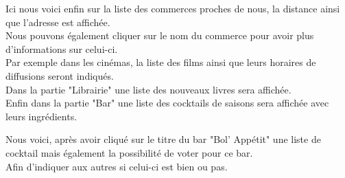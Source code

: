 \documentclass[10pt,a4paper, landscape]{report}
\begin{document}
{{{{Ici nous voici enfin sur la liste des commerces proches de nous, la distance ainsi que l'adresse est affichée. \\
Nous pouvons également cliquer sur le nom du commerce pour avoir plus d'informations sur celui-ci. \\
Par exemple dans les cinémas, la liste des films ainsi que leurs horaires de diffusions seront indiqués. \\
Dans la partie "Librairie" une liste des nouveaux livres sera affichée. \\
Enfin dans la partie "Bar" une liste des cocktails de saisons sera affichée avec leurs ingrédients. \\
{%
\setlength{\fboxsep}{0pt}%
\setlength{\fboxrule}{2pt}%
%

\newpage
Nous voici, après avoir cliqué sur le titre du bar "Bol' Appétit" une liste de cocktail mais également la possibilité de voter pour ce bar. \\
Afin d'indiquer aux autres si celui-ci est bien ou pas. \\
{%
\setlength{\fboxsep}{0pt}%
\setlength{\fboxrule}{2pt}%
%

}}}}}}
\end{document}
